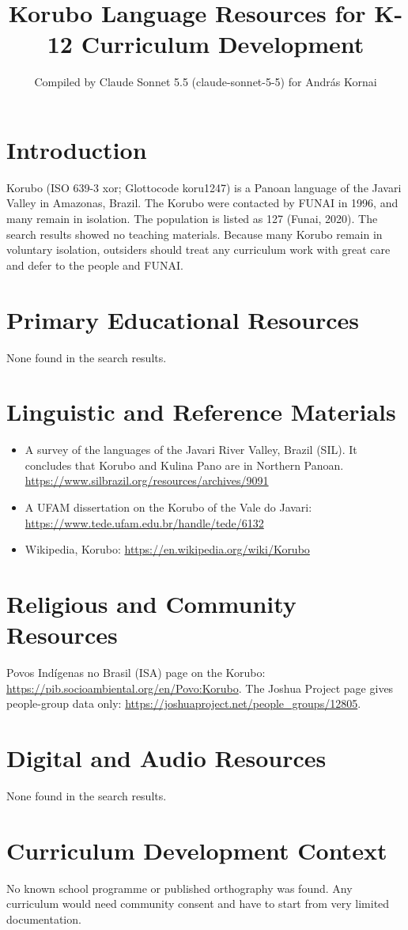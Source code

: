 \documentclass[12pt]{article}
\title{Korubo Language Resources for K-12 Curriculum Development}
\author{Compiled by Claude Sonnet 5.5 (claude-sonnet-5-5) for Andr\'as Kornai}
\date{}
\begin{document}
\maketitle
\section{Introduction}
Korubo (ISO 639-3 xor; Glottocode koru1247) is a Panoan language of the Javari Valley in Amazonas, Brazil. The Korubo were contacted by FUNAI in 1996, and many remain in isolation. The population is listed as 127 (Funai, 2020). The search results showed no teaching materials. Because many Korubo remain in voluntary isolation, outsiders should treat any curriculum work with great care and defer to the people and FUNAI.

\section{Primary Educational Resources}
None found in the search results.

\section{Linguistic and Reference Materials}
\begin{itemize}
\item A survey of the languages of the Javari River Valley, Brazil (SIL). It concludes that Korubo and Kulina Pano are in Northern Panoan. \url{https://www.silbrazil.org/resources/archives/9091}
\item A UFAM dissertation on the Korubo of the Vale do Javari: \url{https://www.tede.ufam.edu.br/handle/tede/6132}
\item Wikipedia, Korubo: \url{https://en.wikipedia.org/wiki/Korubo}
\end{itemize}

\section{Religious and Community Resources}
Povos Ind\'igenas no Brasil (ISA) page on the Korubo: \url{https://pib.socioambiental.org/en/Povo:Korubo}. The Joshua Project page gives people-group data only: \url{https://joshuaproject.net/people_groups/12805}.

\section{Digital and Audio Resources}
None found in the search results.

\section{Curriculum Development Context}
No known school programme or published orthography was found. Any curriculum would need community consent and have to start from very limited documentation.
\end{document}
